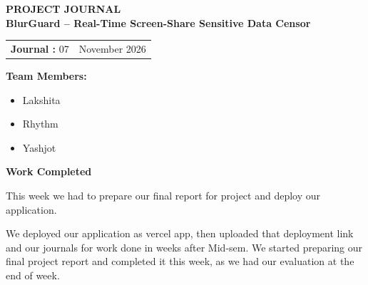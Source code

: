 \documentclass[12pt,a4paper]{article}
\begin{document}

\begin{center}
    {\Large \textbf{PROJECT JOURNAL }}\\[10pt]

    {\large \textbf{BlurGuard -- Real-Time Screen-Share Sensitive Data Censor}}
\end{center}

\vspace{10pt}


\begin{tabular}{@{}p{}p{}@{}}
\textbf{Journal :} 07 &
\raggedleft \textbf{} November 2026
\end{tabular}

\vspace{12pt}


\textbf{Team Members:}

\begin{itemize}[leftmargin=1.5cm]
    \item Lakshita
    \item Rhythm
    \item Yashjot
\end{itemize}

\vspace{5pt}


\textbf{\large Work Completed}

\vspace{4pt}
This week we had to prepare our final report for project and deploy our application.

We deployed our application as vercel app, then uploaded that deployment link and our journals for work done in weeks after Mid-sem. We started preparing our final project report and completed it this week, as we had our evaluation at the end of week.

\vspace{8pt}

\end{document}
